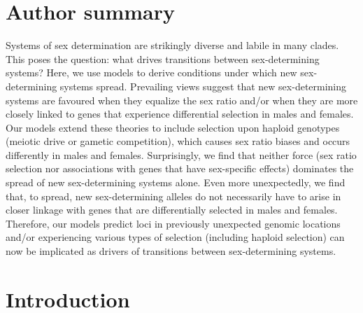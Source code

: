 \documentclass[10pt,letterpaper]{article}
\begin{document}
\section*{Author summary}
Systems of sex determination are strikingly diverse and labile in many clades. 
This poses the question: what drives transitions between sex-determining systems? 
Here, we use models to derive conditions under which new sex-determining systems spread. 
Prevailing views suggest that new sex-determining systems are favoured when they equalize the sex ratio and/or when they are more closely linked to genes that experience differential selection in males and females. 
Our models extend these theories to include selection upon haploid genotypes (meiotic drive or gametic competition), which causes sex ratio biases and occurs differently in males and females. 
Surprisingly, we find that neither force (sex ratio selection nor associations with genes that have sex-specific effects) dominates the spread of new sex-determining systems alone. 
Even more unexpectedly, we find that, to spread, new sex-determining alleles do not necessarily have to arise in closer linkage with genes that are differentially selected in males and females. 
Therefore, our models predict loci in previously unexpected genomic locations and/or experiencing various types of selection (including haploid selection) can now be implicated as drivers of transitions between sex-determining systems. 

\linenumbers

\section*{Introduction}
\end{document}
